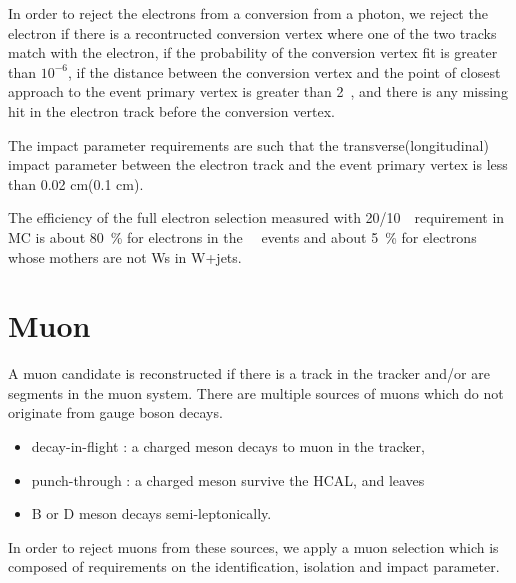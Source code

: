 In order to reject the electrons from a conversion from a photon, we reject the electron 
if there is a recontructed conversion vertex where one of the two tracks match with 
the electron, if the probability of the conversion vertex fit is greater than $10^{-6}$, 
if the distance between the conversion vertex and the point of closest approach 
to the event primary vertex is greater than 2~\cm,
and there is any missing hit in the electron track before the conversion vertex.   

The impact parameter requirements are such that the transverse(longitudinal) impact parameter
between the electron track and the event primary vertex is less than 0.02 cm(0.1 cm). 

The efficiency of the full electron selection measured with 20/10~\GeV\ requirement 
in MC is about 80~\% for electrons in the ~\GeV\ events 
and about 5~\% for electrons whose mothers are not Ws in W+jets.

\section{ Muon }

A muon candidate is reconstructed if there 
is a track in the tracker and/or are segments in the muon system. 
There are multiple sources of muons which do not originate from gauge boson decays. 
\begin{itemize}
\item decay-in-flight : a charged meson decays to muon in the tracker, 
\item punch-through : a charged meson survive the HCAL, and leaves 
\item B or D meson decays semi-leptonically.  
\end{itemize}
In order to reject muons from these sources, 
we apply a muon selection which is composed of requirements 
on the identification,
isolation and impact parameter.  

